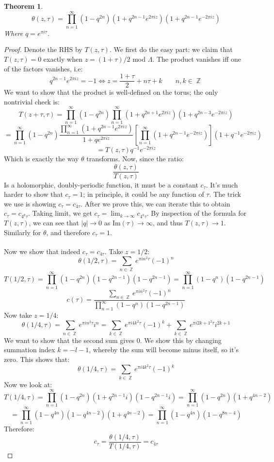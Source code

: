 \documentclass[12 pt]{article}
\DeclareMathOperator {\Z} {\mathbb{Z}}
\theoremstyle{plain}
\newtheorem{thm}{Theorem}
\theoremstyle{definition}
\theoremstyle{remark}
\begin{document}
\begin{thm}
\[  \theta(z, \tau) = \prod_{n=1}^{\infty} (1 - q^{2n}) (1 + q^{2n-1} e^{2\pi i z}) (1 + q^{2n-1} e^{-2\pi i z})  \]
Where $q = e^{\pi i \tau}$.
\end{thm}
\begin{proof}
Denote the RHS by $T(z, \tau)$. We first do the easy part: we claim that $T(z, \tau) = 0$ exactly when $z = (1+\tau)/2$ mod $\Lambda$. The product vanishes iff one of the factors vanishes, i.e:
\[    q^{2n-1} e^{2\pi i z} = -1 \Leftrightarrow z = \frac{1+\tau}{2} + n\tau + k  \;\;\;\;\;\;\; n,k\in \Z  \]
We want to show that the product is well-defined on the torus; the only nontrivial check is:
\[      T(z+\tau, \tau) =  \prod_{n=1}^{\infty} (1 - q^{2n}) \prod_{n=1}^{\infty} (1 + q^{2n+1} e^{2 \pi i z}) (1 + q^{2n-3} e^{-2\pi i z})      \]
\[    =   \prod_{n=1}^{\infty} (1 - q^{2n}) \frac{ \prod_{n=1}^{\infty} (1 + q^{2n-1} e^{2 \pi i z})}{1+ q e^{2\pi i z}} \left[ \prod_{n=1}^{\infty} (1 + q^{2n-1} e^{-2 \pi i z}) \right] ( 1+ q^{-1} e^{-2\pi i z})  \]
\[     = T(z, \tau) q^{-1} e^{-2\pi i z}     \]
Which is exactly the way $\theta$ transforms. Now, since the ratio:
\[    \frac{\theta(z, \tau)}{T(z,\tau)}   \]
Is a holomorphic, doubly-periodic function, it must be a constant $c_{\tau}$. It's much harder to show that $c_{\tau} = 1$; in principle, it could be any function of $\tau$. The trick we use is showing $c_{\tau} = c_{4\tau}$. After we prove this, we can iterate this to obtain $c_{\tau} = c_{4^k \tau}$. Taking limit, we get $c_{\tau} = \lim_{k\to \infty} c_{4^k \tau}$. By inspection of the formula for $T(z, \tau)$, we can see that $|q| \to 0$ as Im$(\tau) \to \infty$, and thus $T(z, \tau) \to 1$. Similarly for $\theta$, and therefore $c_{\tau} = 1$.
\\
\\
Now we show that indeed $c_{\tau} = c_{4\tau}$. Take $z = 1/2$:
\[   \theta(1/2, \tau) = \sum_{n\in \Z} e^{\pi i n^2 \tau} (-1)^n    \]
\[   T(1/2, \tau) = \prod_{n=1}^{\infty} (1 - q^{2n}) (1 - q^{2n-1}) (1 - q^{2n-1}) =\prod_{n=1}^{\infty} (1 - q^{n}) (1 - q^{2n-1})  \]
\[     c(\tau) = \frac{ \sum_{n\in \Z} e^{\pi i n^2 \tau} (-1)^n  }{\prod_{n=1}^{\infty} (1 - q^{n}) (1 - q^{2n-1})}     \]
Now take $z = 1/4$:
\[        \theta(1/4, \tau) = \sum_{n\in\Z} e^{\pi i n^2 \tau}  i^n  = \sum_{k \in \Z} e^{\pi i 4k^2 \tau} (-1)^k + \sum_{k \in \Z} e^{\pi i {2k+1}^2 \tau} i^{2k+1} \]
We want to show that the second sum gives 0. We show this by changing summation index $k = -l - 1$, whereby the sum will become minus itself, so it's zero. This shows that:
\[     \theta(1/4, \tau) = \sum_{k \in \Z} e^{\pi i 4k^2 \tau} (-1)^k    \]
Now we look at:
\[    T(1/4, \tau) = \prod_{n=1}^{\infty} (1 - q^{2n}) (1 + q^{2n-1} i) (1 - q^{2n-1} i)  = \prod_{n=1}^{\infty} (1 - q^{2n}) (1 + q^{4n-2})  \]
\[    =    \prod_{n=1}^{\infty} (1 - q^{4n}) (1 - q^{4n-2}) (1 + q^{4n-2}) = \prod_{n=1}^{\infty} (1 - q^{4n}) (1 - q^{8n-4})  \]
Therefore:
\[    c_{\tau} = \frac{\theta(1/4, \tau)}{T(1/4, \tau)} = c_{4\tau}  \]
\end{proof}
\end{document}
